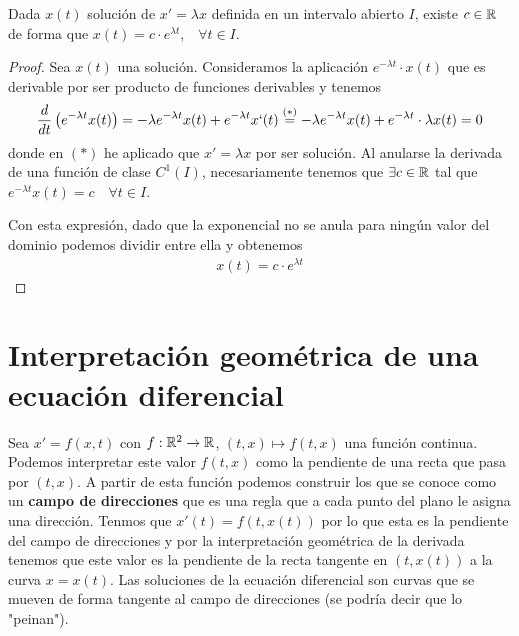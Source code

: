 \begin{prop}
    Dada $x(t)$ solución de $x'=\lambda x$ definida en un intervalo abierto $I$, existe $c\in \mathbb{R}$ de forma que $x(t)=c \cdot e^{\lambda t}$,\ \ $\forall t \in I$.

    \begin{proof}
        Sea $x(t)$ una solución. Consideramos la aplicación $e^{-\lambda t} \cdot x(t)$ que es derivable por ser producto de funciones derivables y tenemos
        \begin{gather*}
            \frac{d}{dt}\left( e^{-\lambda t} x(t)\right) = -\lambda e^{-\lambda t} x(t) + e^{-\lambda t}x`(t) \overset{(*)}{=}-\lambda e^{-\lambda t} x(t) + e^{-\lambda t}\cdot \lambda x(t) = 0
        \end{gather*}
        donde en $(*)$ he aplicado que $x'=\lambda x$ por ser solución. Al anularse la derivada de una función de clase $C^1(I)$, necesariamente tenemos que $\exists c \in \mathbb{R}$ tal que $e^{-\lambda t}x(t)=c$\ \ $\forall t \in I$.

        Con esta expresión, dado que la exponencial no se anula para ningún valor del dominio podemos dividir entre ella y obtenemos
        \begin{gather*}
            x(t)=c\cdot e^{\lambda t}
        \end{gather*}
    \end{proof}
\end{prop}

\section{Interpretación geométrica de una ecuación diferencial}
Sea $x'=f(x,t)$ con $f:\mathbb{R}^2 \to \mathbb{R}$, $(t,x)\mapsto f(t,x)$ una función continua. Podemos interpretar este valor $f(t,x)$ como la pendiente de una recta que pasa por $(t,x)$. A partir de esta función podemos construir los que se conoce como un \textbf{campo de direcciones} que es una regla que a cada punto del plano le asigna una dirección. Tenmos que $x'(t)=f(t,x(t))$ por lo que esta es la pendiente del campo de direcciones y por la interpretación geométrica de la derivada tenemos que este valor es la pendiente de la recta tangente en $(t,x(t))$ a la curva $x=x(t)$. Las soluciones de la ecuación diferencial son curvas que se mueven de forma tangente al campo de direcciones (se podría decir que lo "peinan").

